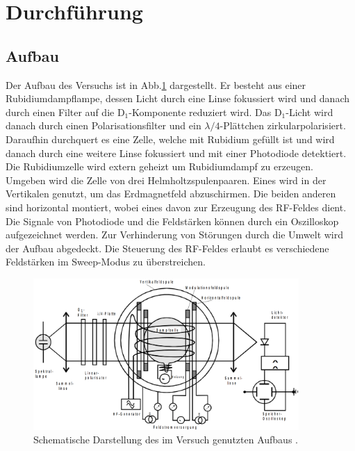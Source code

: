 \section{Durchführung}
\subsection{Aufbau}
Der Aufbau des Versuchs ist in Abb.\ref{aufbau} dargestellt.  Er besteht aus einer Rubidiumdampflampe, dessen Licht durch eine Linse fokussiert wird und danach durch einen Filter auf die D$_1$-Komponente reduziert wird. Das D$_1$-Licht wird danach durch einen Polarisationsfilter und ein $\lambda/4$-Plättchen zirkularpolarisiert. Daraufhin durchquert es eine Zelle, welche mit Rubidium gefüllt ist und wird danach durch eine weitere Linse fokussiert und mit einer Photodiode detektiert. Die Rubidiumzelle wird extern geheizt um Rubidiumdampf zu erzeugen. Umgeben wird die Zelle von drei Helmholtzspulenpaaren. Eines wird in der Vertikalen genutzt, um das Erdmagnetfeld abzuschirmen. Die beiden anderen sind horizontal montiert, wobei eines davon zur Erzeugung des RF-Feldes dient. Die Signale von Photodiode und die Feldstärken können durch ein Oszilloskop aufgezeichnet werden. Zur Verhinderung von Störungen durch die Umwelt wird der Aufbau abgedeckt. Die Steuerung des RF-Feldes erlaubt es verschiedene Feldstärken im Sweep-Modus zu überstreichen.
\begin{figure}
  \includegraphics[width=0.9\textwidth]{Bilder/Aufbau}
  \caption{Schematische Darstellung des im Versuch genutzten Aufbaus \cite{anleitung}.}
  \label{aufbau}
\end{figure}
